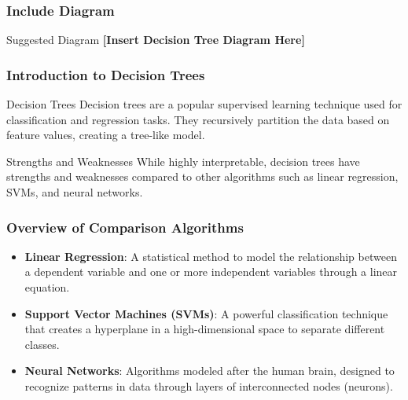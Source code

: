 \documentclass[aspectratio=169]{beamer}
\begin{document}
\begin{frame}[fragile]
  \frametitle{Include Diagram}
  \begin{block}{Suggested Diagram}
    \centering
    \textbf{[Insert Decision Tree Diagram Here]}
  \end{block}
\end{frame}

\begin{frame}[fragile]
    \frametitle{Introduction to Decision Trees}
    \begin{block}{Decision Trees}
        Decision trees are a popular supervised learning technique used for classification and regression tasks. They recursively partition the data based on feature values, creating a tree-like model.
    \end{block}
    \begin{block}{Strengths and Weaknesses}
        While highly interpretable, decision trees have strengths and weaknesses compared to other algorithms such as linear regression, SVMs, and neural networks.
    \end{block}
\end{frame}

\begin{frame}[fragile]
    \frametitle{Overview of Comparison Algorithms}
    \begin{itemize}
        \item \textbf{Linear Regression}: A statistical method to model the relationship between a dependent variable and one or more independent variables through a linear equation.
        \item \textbf{Support Vector Machines (SVMs)}: A powerful classification technique that creates a hyperplane in a high-dimensional space to separate different classes.
        \item \textbf{Neural Networks}: Algorithms modeled after the human brain, designed to recognize patterns in data through layers of interconnected nodes (neurons).
    \end{itemize}
\end{frame}
\end{document}
